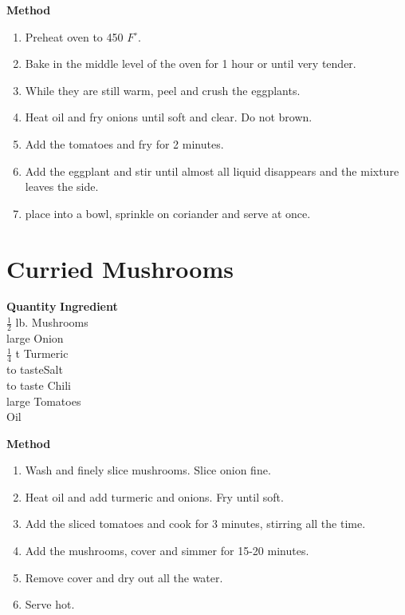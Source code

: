 {\bf Method}
\begin{enumerate}
\item Preheat oven to 450 $F^\circ$.
\item Bake in the middle level of the oven for 1 hour or until very tender.
\item While they are still warm, peel and crush the eggplants.
\item Heat oil and fry onions until soft and clear. Do not brown.
\item Add the tomatoes and fry for 2 minutes.
\item Add the eggplant and stir until almost all liquid disappears and the 
mixture leaves the side.
\item place into a bowl, sprinkle on coriander and serve at once.
\end{enumerate}


\section{Curried Mushrooms}

\begin{tabbing}
\hspace{1.0cm}  \={\bf Quantity}   \hspace{3.0cm} \={\bf Ingredient}\\
\>$\frac{1}{2}$ lb. \>Mushrooms\\
 large \>Onion\\
\>$\frac{1}{4}$ t \>Turmeric\\
\>to taste\>Salt \\
\>to taste\> Chili \\
 large \>Tomatoes\\
\>\>Oil\\
\end{tabbing}

{\bf Method}
\begin{enumerate}
\item Wash and finely slice mushrooms. Slice onion fine.
\item Heat oil and add turmeric and onions.  Fry until soft.
\item Add the sliced tomatoes and cook for 3 minutes, stirring all the time.
\item Add the mushrooms, cover and simmer for 15-20 minutes.
\item Remove cover and dry out all the water. 
\item Serve hot.
\end{enumerate}


